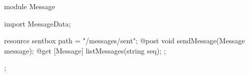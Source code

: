 module  Message {
 import MessageData; 

 resource sentbox { 
  path = "/messages/sent";
  @post void sendMessage(Message message); 
  @get [Message] listMessages(string seq); 
 };
};